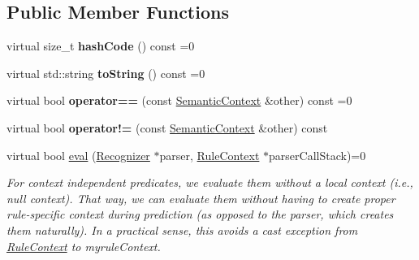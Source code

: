 \subsection*{Public Member Functions}
\begin{DoxyCompactItemize}
\item 
\mbox{\label{classantlr4_1_1atn_1_1SemanticContext_ac08c09d5e71f61632683d179839286bb}} 
virtual size\+\_\+t {\bfseries hash\+Code} () const =0
\item 
\mbox{\label{classantlr4_1_1atn_1_1SemanticContext_a090303bb78b1261298a5affb3f2e318e}} 
virtual std\+::string {\bfseries to\+String} () const =0
\item 
\mbox{\label{classantlr4_1_1atn_1_1SemanticContext_a815a63f3e7564e93ea52c2612b5bec55}} 
virtual bool {\bfseries operator==} (const \hyperlink{classantlr4_1_1atn_1_1SemanticContext}{Semantic\+Context} \&other) const =0
\item 
\mbox{\label{classantlr4_1_1atn_1_1SemanticContext_a34e978e8cd0b7cbdafbaa8e5a8091903}} 
virtual bool {\bfseries operator!=} (const \hyperlink{classantlr4_1_1atn_1_1SemanticContext}{Semantic\+Context} \&other) const
\item 
virtual bool \hyperlink{classantlr4_1_1atn_1_1SemanticContext_a77bcdcfae815a6497ed281445417f699}{eval} (\hyperlink{classantlr4_1_1Recognizer}{Recognizer} $\ast$parser, \hyperlink{classantlr4_1_1RuleContext}{Rule\+Context} $\ast$parser\+Call\+Stack)=0
\begin{DoxyCompactList}\small\item\em For context independent predicates, we evaluate them without a local context (i.\+e., null context). That way, we can evaluate them without having to create proper rule-\/specific context during prediction (as opposed to the parser, which creates them naturally). In a practical sense, this avoids a cast exception from \hyperlink{classantlr4_1_1RuleContext}{Rule\+Context} to myrule\+Context. 


\end{DoxyCompactList}
\end{DoxyCompactItemize}

